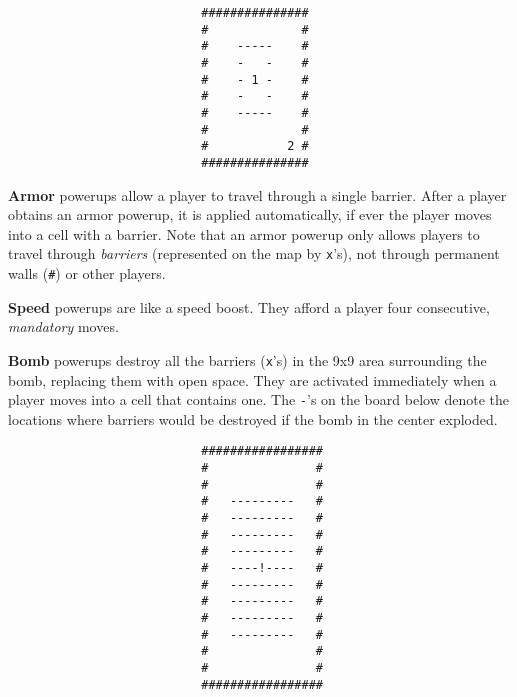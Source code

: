 \documentclass{article}
\newcommand{\amy}[1]{{\color{blue}[Amy: #1]}}
\begin{document}
\begin{verbatim}
                           ###############
                           #             #
                           #    -----    #
                           #    -   -    #
                           #    - 1 -    #
                           #    -   -    #
                           #    -----    #
                           #             #
                           #           2 #
                           ###############
\end{verbatim}

\textbf{Armor} powerups allow a player to travel through a single
barrier.  After a player obtains an armor powerup, it is applied
automatically, if ever the player moves into a cell with a barrier.
Note that an armor powerup only allows players to travel through
\textit{barriers} (represented on the map by \texttt{x}'s), not
through permanent walls (\texttt{\#}) or other players.

\textbf{Speed} powerups are like a speed boost.  They afford a player
four consecutive, \emph{mandatory\/} moves.

\textbf{Bomb} powerups destroy all the barriers (\texttt{x}'s) in the
9x9 area surrounding the bomb, replacing them with open space.  They
are activated immediately when a player moves into a cell that
contains one.  The \texttt{-}'s on the board below denote the
locations where barriers would be destroyed if the bomb in the center
exploded.

\begin{centering}
\begin{verbatim}
                           #################
                           #               #
                           #               #
                           #   ---------   #
                           #   ---------   #
                           #   ---------   #
                           #   ---------   #
                           #   ----!----   #
                           #   ---------   #
                           #   ---------   #
                           #   ---------   #
                           #   ---------   #
                           #               #
                           #               #
                           #################
\end{verbatim}
\end{centering}
\end{document}
